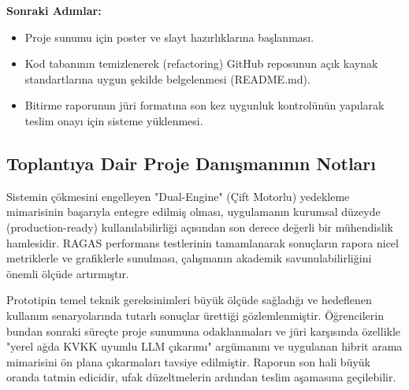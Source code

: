 \documentclass[a4paper,12pt]{article}
\begin{document}
\textbf{Sonraki Adımlar:}
\begin{itemize}
    \item Proje sunumu için poster ve slayt hazırlıklarına başlanması.
    \item Kod tabanının temizlenerek (refactoring) GitHub reposunun açık kaynak standartlarına uygun şekilde belgelenmesi (README.md).
    \item Bitirme raporunun jüri formatına son kez uygunluk kontrolünün yapılarak teslim onayı için sisteme yüklenmesi.
\end{itemize}

\vspace{1cm}

\subsection*{Toplantıya Dair Proje Danışmanının Notları}
\noindent 
Sistemin çökmesini engelleyen "Dual-Engine" (Çift Motorlu) yedekleme mimarisinin başarıyla entegre edilmiş olması, uygulamanın kurumsal düzeyde (production-ready) kullanılabilirliği açısından son derece değerli bir mühendislik hamlesidir. RAGAS performans testlerinin tamamlanarak sonuçların rapora nicel metriklerle ve grafiklerle sunulması, çalışmanın akademik savunulabilirliğini önemli ölçüde artırmıştır.

Prototipin temel teknik gereksinimleri büyük ölçüde sağladığı ve hedeflenen kullanım senaryolarında tutarlı sonuçlar ürettiği gözlemlenmiştir. Öğrencilerin bundan sonraki süreçte proje sunumuna odaklanmaları ve jüri karşısında özellikle "yerel ağda KVKK uyumlu LLM çıkarımı" argümanını ve uygulanan hibrit arama mimarisini ön plana çıkarmaları tavsiye edilmiştir. Raporun son hali büyük oranda tatmin edicidir, ufak düzeltmelerin ardından teslim aşamasına geçilebilir.

\vspace{3cm}
\end{document}
